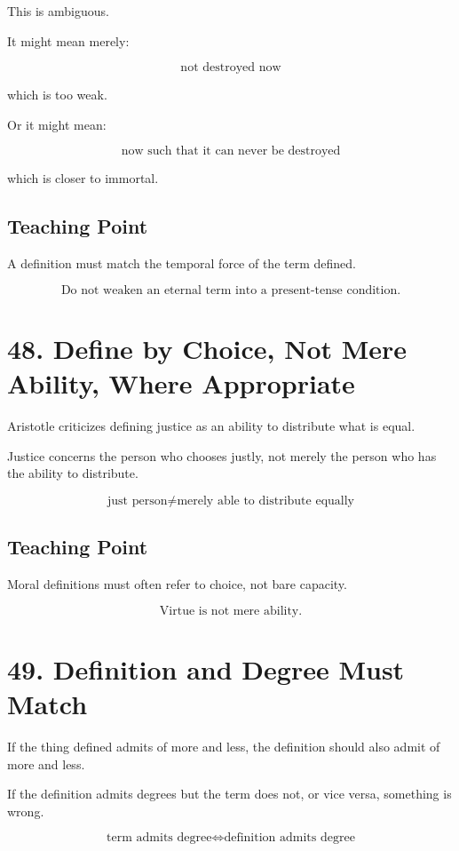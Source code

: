 \documentclass[12pt]{article}
\begin{document}
This is ambiguous.

It might mean merely:

\[
\text{not destroyed now}
\]

which is too weak.

Or it might mean:

\[
\text{now such that it can never be destroyed}
\]

which is closer to immortal.

\subsection*{Teaching Point}

A definition must match the temporal force of the term defined.

\[
\boxed{
\text{Do not weaken an eternal term into a present-tense condition.}
}
\]

\section*{48. Define by Choice, Not Mere Ability, Where Appropriate}

Aristotle criticizes defining justice as an ability to distribute what is equal.

Justice concerns the person who chooses justly, not merely the person who has
the ability to distribute.

\[
\text{just person} \neq \text{merely able to distribute equally}
\]

\subsection*{Teaching Point}

Moral definitions must often refer to choice, not bare capacity.

\[
\boxed{
\text{Virtue is not mere ability.}
}
\]

\section*{49. Definition and Degree Must Match}

If the thing defined admits of more and less, the definition should also admit
of more and less.

If the definition admits degrees but the term does not, or vice versa, something
is wrong.

\[
\text{term admits degree} \Leftrightarrow \text{definition admits degree}
\]
\end{document}
